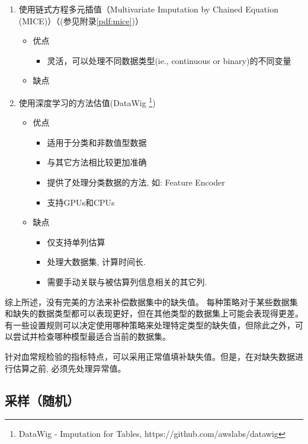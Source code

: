 \documentclass[UTF8,a4paper,12pt, onecolumn]{ctexart}
\begin{document}
\begin{enumerate}
\begin{itemize}
\begin{itemize}
		\end{itemize}
	\end{itemize}
	\item 使用链式方程多元插值（Multivariate Imputation by Chained Equation (MICE)）\cite{buuren2010mice}（(参见附录\ref{pdf:mice})）
	\begin{itemize}
		\item 优点 
		\begin{itemize}
		  \item 灵活，可以处理不同数据类型(ie., continuous or binary)的不同变量
		\end{itemize}
		\item 缺点 
	\end{itemize}
	\item 使用深度学习的方法估值(DataWig \footnote{DataWig - Imputation for Tables, https://github.com/awslabs/datawig})
	\begin{itemize}
		\item 优点
		\begin{itemize}
		  \item 适用于分类和非数值型数据
		  \item 与其它方法相比较更加准确
		  \item 提供了处理分类数据的方法, 如: Feature Encoder
		  \item 支持GPUs和CPUs
		\end{itemize}
		\item 缺点
		\begin{itemize}
		  \item 仅支持单列估算
		  \item 处理大数据集, 计算时间长.
		  \item 需要手动关联与被估算列信息相关的其它列.
		\end{itemize}

	\end{itemize}
\end{enumerate}

综上所述，没有完美的方法来补偿数据集中的缺失值。 每种策略对于某些数据集和缺失的数据类型都可以表现更好，但在其他类型的数据集上可能会表现得更差。 有一些设置规则可以决定使用哪种策略来处理特定类型的缺失值，但除此之外，可以尝试并检查哪种模型最适合当前的数据集。

针对血常规检验的指标特点，可以采用正常值填补缺失值。但是，在对缺失数据进行估算之前, 必须先处理异常值。

\subsection{采样（随机）}
\end{document}
